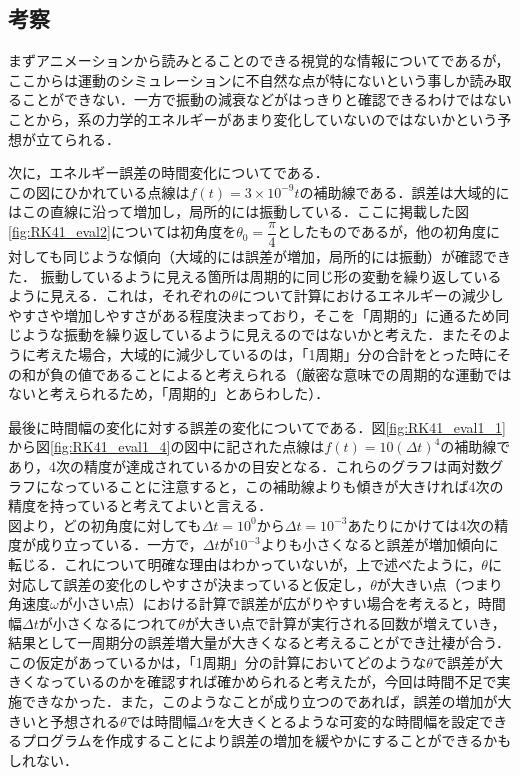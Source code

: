 \documentclass[a4paper,11pt]{jsarticle}
\begin{document}
\subsection{考察} \label{ch:RK41_discussion}
まずアニメーションから読みとることのできる視覚的な情報についてであるが，ここからは運動のシミュレーションに不自然な点が特にないという事しか読み取ることができない．一方で振動の減衰などがはっきりと確認できるわけではないことから，系の力学的エネルギーがあまり変化していないのではないかという予想が立てられる．\par
次に，エネルギー誤差の時間変化についてである．\\
この図にひかれている点線は\(f(t) = 3\times10^{-9}t\)の補助線である．誤差は大域的にはこの直線に沿って増加し，局所的には振動している．ここに掲載した図\ref{fig:RK41_eval2}については初角度を\(\theta_0 = \dfrac{\pi}{4}\)としたものであるが，他の初角度に対しても同じような傾向（大域的には誤差が増加，局所的には振動）が確認できた．
振動しているように見える箇所は周期的に同じ形の変動を繰り返しているように見える．これは，それぞれの\(\theta\)について計算におけるエネルギーの減少しやすさや増加しやすさがある程度決まっており，そこを「周期的」に通るため同じような振動を繰り返しているように見えるのではないかと考えた．またそのように考えた場合，大域的に減少しているのは，「1周期」分の合計をとった時にその和が負の値であることによると考えられる（厳密な意味での周期的な運動ではないと考えられるため，「周期的」とあらわした）．\par
最後に時間幅の変化に対する誤差の変化についてである．図\ref{fig:RK41_eval1_1}から図\ref{fig:RK41_eval1_4}の図中に記された点線は\(f(t) = 10(\Delta t)^{4}\)の補助線であり，4次の精度が達成されているかの目安となる．これらのグラフは両対数グラフになっていることに注意すると，この補助線よりも傾きが大きければ4次の精度を持っていると考えてよいと言える．\\
図より，どの初角度に対しても\(\Delta t = 10^0\)から\(\Delta t = 10^{-3}\)あたりにかけては4次の精度が成り立っている．一方で，\(\Delta t\)が\(10^{-3}\)よりも小さくなると誤差が増加傾向に転じる．これについて明確な理由はわかっていないが，上で述べたように，\(\theta\)に対応して誤差の変化のしやすさが決まっていると仮定し，\(\theta\)が大きい点（つまり角速度\(\omega\)が小さい点）における計算で誤差が広がりやすい場合を考えると，時間幅\(\Delta t\)が小さくなるにつれて\(\theta\)が大きい点で計算が実行される回数が増えていき，結果として一周期分の誤差増大量が大きくなると考えることができ辻褄が合う．\\
この仮定があっているかは，「1周期」分の計算においてどのような\(\theta\)で誤差が大きくなっているのかを確認すれば確かめられると考えたが，今回は時間不足で実施できなかった．また，このようなことが成り立つのであれば，誤差の増加が大きいと予想される\(\theta\)では時間幅\(\Delta t\)を大きくとるような可変的な時間幅を設定できるプログラムを作成することにより誤差の増加を緩やかにすることができるかもしれない．
\end{document}
